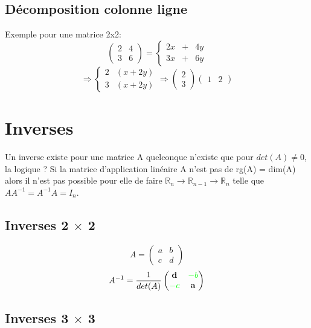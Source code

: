 \documentclass[10pt,a4paper]{book}
\newcommand{\R}{\mathbb{R}}
\newcommand{\x}{$\times$ }
\begin{document}
\subsection{Décomposition colonne ligne}
Exemple pour une matrice 2x2:
\[\begin{pmatrix}
2 & 4 \\
3 & 6
\end{pmatrix}
= \left\lbrace \begin{array}{rcl}
2x & + & 4y \\
3 x & + & 6y
\end{array} \right.
\]
\[\Rightarrow \left\lbrace \begin{array}{rcl}
2 & (x + 2y) \\
3 & (x + 2y)
\end{array} \right.
\Rightarrow
\begin{pmatrix}
2 \\ 3
\end{pmatrix}
\begin{pmatrix}
1 & 2
\end{pmatrix}
\]

\section{Inverses}
Un inverse existe pour une matrice A quelconque n'existe que pour $det(A) \neq 0$, la logique ? Si la matrice d'application linéaire A n'est pas de rg(A) = dim(A) alors il n'est pas possible pour elle de faire $\R_n \rightarrow \R_{n-1} \rightarrow \R_n$ telle que $AA^{-1} = A^{-1}A = I_n$.

\subsection{Inverses 2 \x 2}

\[A = \begin{pmatrix}
a & b \\
c & d
\end{pmatrix}
\]
\[A^{-1} = \frac{1}{det(A)} \begin{pmatrix}
\mathbf{d} & \textcolor{green}{-b} \\
\textcolor{green}{-c} & \mathbf{a}
\end{pmatrix}
\]

\subsection{Inverses 3 \x 3}
\end{document}
